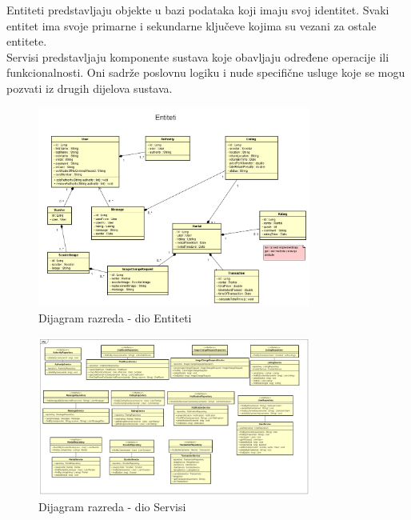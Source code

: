 			 \indent Entiteti predstavljaju objekte u bazi podataka koji imaju svoj identitet. Svaki entitet ima svoje primarne i sekundarne ključeve kojima su vezani za ostale entitete. \\
			 
			 \indent Servisi predstavljaju komponente sustava koje obavljaju određene operacije ili funkcionalnosti. Oni sadrže poslovnu logiku i nude specifične usluge koje se mogu pozvati iz drugih dijelova sustava. \\
			 
			\begin{figure}[H]
				\centering
				\includegraphics[width=0.8\textwidth]{dijagrami/entiteti.png}
				\caption{Dijagram razreda - dio Entiteti}
				\label{fig:your_label}
			\end{figure}
			
			\begin{figure}[H]
				\centering
				\includegraphics[width=0.8\textwidth]{dijagrami/servisi.png}
				\caption{Dijagram razreda - dio Servisi}
				\label{fig:your_label}
			\end{figure}
			
			
			\eject
		
